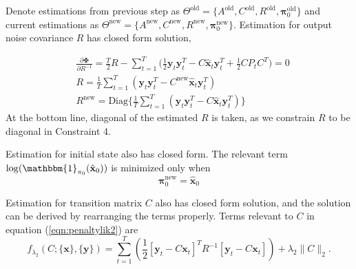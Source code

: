 \documentclass[fleqn]{article}
\let\oldref\ref
\renewcommand{\ref}[1]{(\oldref{#1})}
\newcommand{\T}{T}
\begin{document}
Denote estimations from previous step as $\Theta^{\text{old}} =\{A^{\text{old}},C^{\text{old}},R^{\text{old}},\mathbf{\pi}_0^{\text{old}}\}$ and current estimations as $\Theta^{\text{new}} =\{A^{\text{new}},C^{\text{new}},R^{\text{new}},\mathbf{\pi}_0^{\text{new}}\}$. Estimation for output noise covariance $R$ has closed form solution,

\begin{equation}\label{eq:updateR}
\begin{aligned}
&\frac{\partial \mathbf{\Phi}}{\partial R^{-1}} = \frac{T}{2}R - \sum\limits_{t=1}^T\bigl(\frac{1}{2}\mathbf{y}_t\mathbf{y}_t^{\T} - C\hat{\mathbf{x}}_t\mathbf{y}_t^{\T}+\frac{1}{2}CP_tC^{\T}\bigr) =0 \\
& R = \frac{1}{T}\sum\limits_{t=1}^{T}(\mathbf{y}_t\mathbf{y}_t^{\T}-C^{\text{new}}\hat{\mathbf{x}}_t\mathbf{y}_t^{\T})\\
& R^{\text{new}} =\text{Diag}\biggl\{\frac{1}{T}\sum\limits_{t=1}^{T}(\mathbf{y}_t\mathbf{y}_t^{\T}-C\hat{\mathbf{x}}_t\mathbf{y}_t^{\T})\biggr\}
\end{aligned}
\end{equation}
At the bottom line, diagonal of the estimated $R$ is taken, as we constrain $R$ to be diagonal in Constraint 4.

Estimation for initial state also has closed form. The relevant term $\log(\mathbbm{1}_{\mathbf{\pi}_0}(\hat{\mathbf{x}}_0))$ is minimized only when
\begin{equation*}\label{eq:updatepi}
\mathbf{\pi}_0^{\text{new}} = \hat{\mathbf{x}}_0
\end{equation*}

Estimation for transition matrix $C$ also has closed form solution, and the solution can be derived by rearranging the terms properly. Terms relevant to $C$ in equation \ref{eqn:penaltylik2} are
\begin{equation}\label{eq:penaltylik1}
f_{\lambda_2}(C;\{\mathbf{x}\},\{\mathbf{y}\}) = \sum\limits_{t=1}^{T}\left(\frac{1}{2}[\mathbf{y}_t-C\mathbf{x}_t]^{\T}R^{-1}[\mathbf{y}_t-C\mathbf{x}_t]\right)+\lambda_2 \|C\|_2.
\end{equation}
\end{document}
